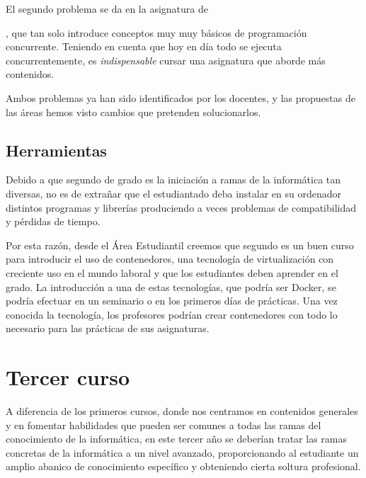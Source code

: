 El segundo problema se da en la asignatura de
\subject{Programación Concurrente y Distribuida},
que tan solo introduce conceptos muy muy básicos de programación concurrente.
Teniendo en cuenta que hoy en día todo se ejecuta concurrentemente,
es \emph{indispensable} cursar una asignatura que aborde más contenidos.

Ambos problemas ya han sido identificados por los docentes,
y las propuestas de las áreas hemos visto cambios que pretenden solucionarlos.

\subsection{Herramientas}

Debido a que segundo de grado es la iniciación a
ramas de la informática tan diversas,
no es de extrañar que el estudiantado deba
instalar en su ordenador distintos programas y librerías
produciendo a veces problemas de compatibilidad y pérdidas de tiempo.

Por esta razón, desde el Área Estudiantil creemos que segundo es un buen curso
para introducir el uso de contenedores,
una tecnología de virtualización con creciente uso en el mundo laboral y
que los estudiantes deben aprender en el grado.
La introducción a una de estas tecnologías, que podría ser Docker,
se podría efectuar en un seminario o en los primeros días de prácticas.
Una vez conocida la tecnología,
los profesores podrían crear contenedores con todo lo necesario
para las prácticas de sus asignaturas.


\section{Tercer curso}

A diferencia de los primeros cursos,
donde nos centramos en contenidos generales y en fomentar habilidades que
pueden ser comunes a todas las ramas del conocimiento de la informática,
en este tercer año
se deberían tratar las ramas concretas de la informática a un nivel avanzado,
proporcionando al estudiante un amplio abanico de conocimiento específico y
obteniendo cierta soltura profesional.

